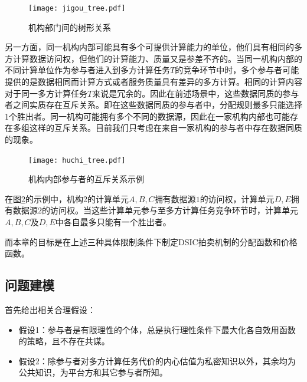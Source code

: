 \documentclass[promaster]{thesis-uestc}
\begin{document}
\begin{figure}[h]
\center
    \texttt{[image: jigou\_tree.pdf]}
    \caption{机构部门间的树形关系}
    \label{jigoushu}
\end{figure}

另一方面，同一机构内部可能具有多个可提供计算能力的单位，他们具有相同的多方计算数据访问权，但他们的计算能力、质量又是参差不齐的。当同一机构内部的不同计算单位作为参与者进入到多方计算任务$T$的竞争环节中时，多个参与者可能提供的是数据相同而计算方式或者服务质量具有差异的多方计算。相同的计算内容对于同一多方计算任务$T$来说是冗余的。因此在前述场景中，这些数据同质的参与者之间实质存在互斥关系。即在这些数据同质的参与者中，分配规则最多只能选择1个胜出者。同一机构可能拥有多个不同的数据源，因此在一家机构内部也可能存在多组这样的互斥关系。目前我们只考虑在来自一家机构的参与者中存在数据同质的现象。

\begin{figure}[H]
    \texttt{[image: huchi\_tree.pdf]}
    \caption{机构内部参与者的互斥关系示例}
    \label{huchishu}
\end{figure}

在图\ref{huchishu}的示例中，机构2的计算单元$A,B,C$拥有数据源$1$的访问权，计算单元$D,E$拥有数据源$2$的访问权。当这些计算单元参与至多方计算任务竞争环节时，计算单元$A,B,C$及$D,E$中各自最多只能有一个胜出者。

而本章的目标是在上述三种具体限制条件下制定DSIC拍卖机制的分配函数和价格函数。

\FloatBarrier

\subsection{问题建模}
\label{xingshihua}

首先给出相关合理假设：

\begin{itemize}
    \item 假设1：参与者是有限理性的个体，总是执行理性条件下最大化各自效用函数的策略，且不存在共谋。
    \item 假设2：除参与者对多方计算任务代价的内心估值为私密知识以外，其余均为公共知识，为平台方和其它参与者所知。
\end{itemize}
\end{document}
